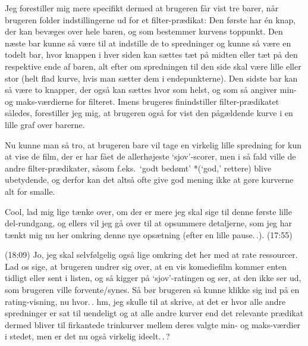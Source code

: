 \documentclass{report}
\begin{document}
Jeg forestiller mig mere specifikt dermed at brugeren får vist tre barer, når brugeren folder indstillingerne ud for et filter-prædikat: Den første har én knap, der kan bevæges over hele baren, og som bestemmer kurvens toppunkt. Den næste bar kunne så være til at indstille de to spredninger og kunne så være en todelt bar, hvor knappen i hver siden kan sættes tæt på midten eller tæt på den respektive ende af baren, alt efter om spredningen til den side skal være lille eller stor (helt flad kurve, hvis man sætter dem i endepunkterne). Den sidste bar kan så være to knapper, der også kan sættes hvor som helst, og som så angiver min- og maks-værdierne for filteret. Imens brugeres finindstiller filter-prædikatet således, forestiller jeg mig, at brugeren også for vist den pågældende kurve i en lille graf over barerne. 

Nu kunne man så tro, at brugeren bare vil tage en virkelig lille spredning for kun at vise de film, der er har fået de allerhøjeste `sjov'-scorer, men i så fald ville de andre filter-prædikater, såsom f.eks.\ `godt bedømt' *(`god,' rettere) blive ubetydende, og derfor kan det altså ofte give god mening ikke at gøre kurverne alt for smalle. 

Cool, lad mig lige tænke over, om der er mere jeg skal sige til denne første lille del-rundgang, og ellers vil jeg gå over til at opsummere detaljerne, som jeg har tænkt mig nu her omkring denne nye opsætning (efter en lille pause.\,.). (17:55)

(18:09) Jo, jeg skal selvfølgelig også lige omkring det her med at rate ressourcer. Lad os sige, at brugeren undrer sig over, at en vis komediefilm kommer enten tidligt eller sent i listen, og så kigger på `sjov'-ratingen og ser, at den ikke ser ud, som brugeren ville forvente/synes. Så bør brugeren så kunne klikke sig ind på en rating-visning, nu hvor.\,. hm, jeg skulle til at skrive, at det er hvor alle andre spredninger er sat til uendeligt og at alle andre kurver end det relevante prædikat dermed bliver til firkantede trinkurver mellem deres valgte min- og maks-værdier i stedet, men er det nu også virkelig ideelt.\,.\,? 
\end{document}
